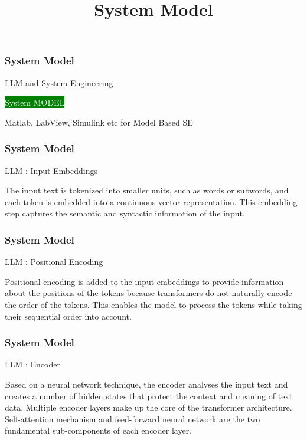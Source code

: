 

\title[Systems Engineering]{ System Model} 



\newpage
\begin{frame}
\frametitle{ System Model }
\begin{block}{LLM and System Engineering }

 \colorbox{green}{ \textcolor{white}{ System MODEL } }

Matlab, LabView, Simulink etc  for Model Based SE

\end{block}
\end{frame}


\newpage
\begin{frame}
\frametitle{ System Model }
\begin{block}{LLM : Input Embeddings }

 The input text is tokenized into smaller units, such as words or subwords, and each token is embedded into a continuous vector representation. This embedding step captures the semantic and syntactic information of the input.
 
\end{block}
\end{frame}


\newpage
\begin{frame}
\frametitle{ System Model }
\begin{block}{LLM : Positional Encoding }

Positional encoding is added to the input embeddings to provide information about the positions of the tokens because transformers do not naturally encode the order of the tokens. This enables the model to process the tokens while taking their sequential order into account.
 
\end{block}
\end{frame}


\newpage
\begin{frame}
\frametitle{ System Model }
\begin{block}{LLM : Encoder }

Based on a neural network technique, the encoder analyses the input text and creates a number of hidden states that protect the context and meaning of text data. Multiple encoder layers make up the core of the transformer architecture. Self-attention mechanism and feed-forward neural network are the two fundamental sub-components of each encoder layer.
 
\end{block}
\end{frame}


